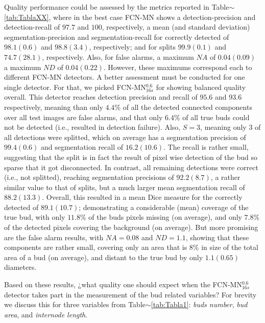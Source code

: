 \documentclass[a4paper,authoryear,review]{elsarticle}
\begin{document}
Quality performance could be assessed by the metrics reported in  Table$\sim$\ref{tab:TablaXX}, where in the best case FCN-MN shows a  detection-precision and detection-recall of $97.7$ and $100$, respectively, a mean (and standard deviation) segmentation-precision and segmentation-recall for correctly detected of $98.1(0.6)$ and $98.8(3.4)$, respectively; and for splits $99.9(0.1)$ and $74.7(28.1)$, respectively. Also, for false alarms, a maximum  $NA$ of $0.04(0.09)$ a maximum $ND$ of $0.04 (0.22)$.  
%
However, these maximums correspond each to different FCN-MN detectors. A better assessment must be conducted for one single detector. For that, we picked FCN-MN$_{16s}^{0.6}$ for showing balanced quality overall. This detector reaches detection precision and recall of $95.6$ and $93.6$ respectively, meaning than only $4.4\%$ of all the detected connected components over all test images are false alarms, and that only $6.4\%$ of all true buds could not be detected (i.e., resulted in detection failure).
%
Also, $S=3$, meaning only $3$ of all detections were splitted, which on average has a segmentation precision of $99.4(0.6)$ and segmentation recall of $16.2(10.6)$. The recall is rather small, suggesting that the split is in fact the result of pixel wise detection of the bud so sparse that it got disconnected. In contrast, all remaining detections were correct (i.e., not splitted), reaching segmentation precisions of $92.2(8.7)$, a rather similar value to that of splits, but a much larger mean segmentation recall of $88.2(13.3)$. Overall, this resulted in a mean Dice measure for the correctly detected of $89.1(10.7)$; demonstrating a considerable (mean) coverage of the true bud, with only $11.8\%$ of the buds pixels missing (on average), and only $7.8\%$ of the detected pixels covering the background (on average).
%
But more promising are the false alarm results, with $NA=0.08$ and $ND=1.1$, showing that these components are rather small, covering only an area that is $8\%$ in size of the total area of a bud (on average), and distant to the true bud by only $1.1 (0.65)$ diameters.

Based on these results, ¿what quality one should expect when the FCN-MN$_{16s}^{0.6}$ detector takes part in the measurement of the bud related variables? For brevity we discuss this  for three variables from Table$\sim$\ref{tab:Tabla1}: \emph{buds number}, \emph{bud area}, and \emph{internode length}.
\end{document}
